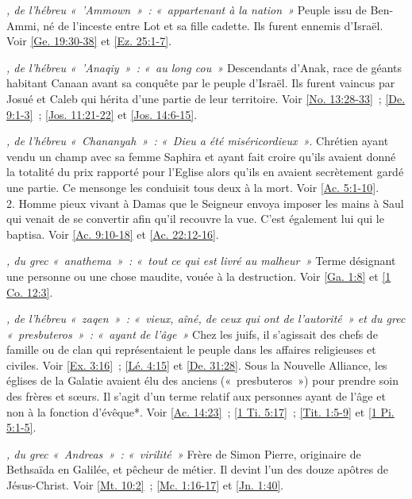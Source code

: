 \begin{multicols}{2}
\textit{, de l'hébreu «~'Ammown~»~: «~appartenant à la nation~»}\newline
Peuple issu de Ben-Ammi, né de l'inceste entre Lot et sa fille cadette. Ils furent ennemis d'Israël. Voir \vref{Ge. 19:30-38} et \vref{Ez. 25:1-7}.

\textit{, de l'hébreu «~'Anaqiy~»~: «~au long cou~»}\newline
Descendants d'Anak, race de géants habitant Canaan avant sa conquête par le peuple d'Israël. Ils furent vaincus par Josué et Caleb qui hérita d'une partie de leur territoire. Voir \vref{No. 13:28-33}~; \vref{De. 9:1-3}~; \vref{Jos. 11:21-22} et \vref{Jos. 14:6-15}.

\textit{, de l'hébreu «~Chananyah~»~: «~Dieu a été miséricordieux~»}. Chrétien ayant vendu un champ avec sa femme Saphira et ayant fait croire qu'ils avaient donné la totalité du prix rapporté pour l'Eglise alors qu'ils en avaient secrètement gardé une partie. Ce mensonge les conduisit tous deux à la mort. Voir \vref{Ac. 5:1-10}.
\\2. Homme pieux vivant à Damas que le Seigneur envoya imposer les mains à Saul qui venait de se convertir afin qu'il recouvre la vue. C'est également lui qui le baptisa. Voir \vref{Ac. 9:10-18} et \vref{Ac. 22:12-16}.

\textit{, du grec «~anathema~»~: «~tout ce qui est livré au malheur~»}\newline
Terme désignant une personne ou une chose maudite, vouée à la destruction. Voir \vref{Ga. 1:8} et \vref{1 Co. 12:3}.

\textit{, de l'hébreu «~zaqen~»~: «~vieux, aîné, de ceux qui ont de l'autorité~» et du grec «~presbuteros~»~: «~ayant de l'âge~»}\newline
Chez les juifs, il s'agissait des chefs de famille ou de clan qui représentaient le peuple dans les affaires religieuses et civiles. Voir \vref{Ex. 3:16}~; \vref{Lé. 4:15} et \vref{De. 31:28}. Sous la Nouvelle Alliance, les églises de la Galatie avaient élu des anciens («~presbuteros~») pour prendre soin des frères et sœurs. Il s'agit d'un terme relatif aux personnes ayant de l'âge et non à la fonction d'évêque*. Voir \vref{Ac. 14:23}~; \vref{1 Ti. 5:17}~; \vref{Tit. 1:5-9} et \vref{1 Pi. 5:1-5}.

\textit{, du grec «~Andreas~»~: «~virilité~»}\newline
Frère de Simon Pierre, originaire de Bethsaïda en Galilée, et pêcheur de métier. Il devint l'un des douze apôtres de Jésus-Christ. Voir \vref{Mt. 10:2}~; \vref{Mc. 1:16-17} et \vref{Jn. 1:40}.


\end{multicols}
